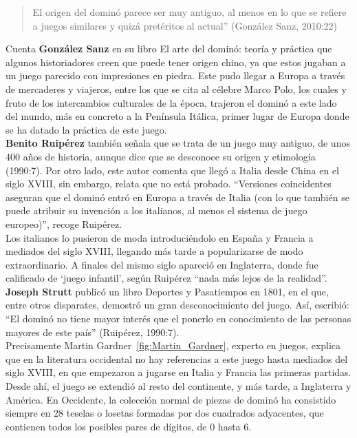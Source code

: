 \begin{quote}
El origen del dominó parece ser muy antiguo, al menos en lo que se refiere a juegos similares y quizá
pretéritos al actual” (González Sanz, 2010:22)
\end{quote}

Cuenta \textbf{González Sanz} en su libro El arte del dominó: teoría y práctica \cite{sanz00} que algunos historiadores
creen que puede tener origen chino, ya que estos jugaban a un juego parecido con impresiones en piedra. Este pudo llegar a Europa a través de mercaderes y viajeros, entre los que se cita al célebre
Marco Polo, los cuales y fruto de los intercambios culturales de la época, trajeron el dominó a este
lado del mundo, más en concreto a la Península Itálica, primer lugar de Europa donde se ha datado la
práctica de este juego. \\

\textbf{Benito Ruipérez} \cite{mora90} también señala que se trata de un juego muy antiguo, de unos 400 años de historia,
aunque dice que se desconoce su origen y etimología (1990:7). Por otro lado, este autor comenta que
llegó a Italia desde China en el siglo XVIII, sin embargo, relata que no está probado. “Versiones
coincidentes aseguran que el dominó entró en Europa a través de Italia (con lo que también se puede
atribuir su invención a los italianos, al menos el sistema de juego europeo)”, recoge Ruipérez. \\

Los italianos lo pusieron de moda introduciéndolo en España y Francia a mediados del siglo XVIII,
llegando más tarde a popularizarse de modo extraordinario. A finales del mismo siglo apareció en
Inglaterra, donde fue calificado de ‘juego infantil’, según Ruipérez “nada más lejos de la realidad”.
\textbf{Joseph Strutt} publicó un libro Deportes y Pasatiempos en 1801, en el que, entre otros disparates,
demostró un gran desconocimiento del juego. Así, escribió: “El dominó no tiene mayor interés que
el ponerlo en conocimiento de las personas mayores de este país” (Ruipérez, 1990:7). \\

Precisamente Martin Gardner~\ref{fig:Martin_Gardner}, experto en juegos, explica que en la literatura occidental no hay
referencias a este juego hasta mediados del siglo XVIII, en que empezaron a jugarse en Italia y
Francia las primeras partidas. Desde ahí, el juego se extendió al resto del continente, y más tarde,
a Inglaterra y América. En Occidente, la colección normal de piezas de dominó ha consistido siempre
en 28 teselas o losetas formadas por dos cuadrados adyacentes, que contienen todos los posibles
pares de dígitos, de 0 hasta 6. \\

